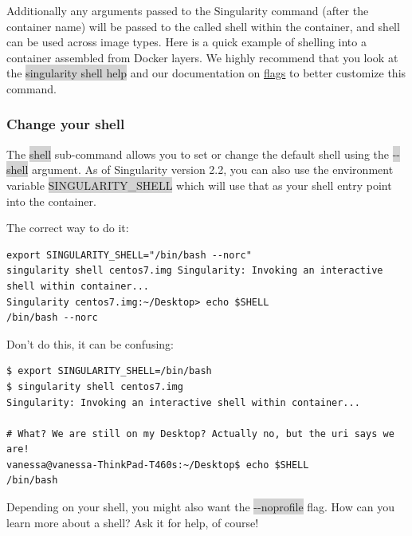 \documentclass[a4paper]{article}
\newcounter{subsubsubsection}[subsubsection]
\begin{document}
Additionally any arguments passed to the Singularity command (after the container name) will be passed to the called shell within the container, and shell can be used across image types. Here is a quick example of shelling into a container assembled from Docker layers. We highly recommend that you look at the \colorbox{lightgray}{singularity shell help} and our documentation on \href{http://singularity.lbl.gov/action-flags}{flags} to better customize this command.

	\subsubsection{Change your shell}
	
	The \colorbox{lightgray}{shell} sub-command allows you to set or change the default shell using the \colorbox{lightgray}{-{}-shell} argument. As of Singularity version 2.2, you can also use the environment variable \colorbox{lightgray}{SINGULARITY\_SHELL} which will use that as your shell entry point into the container.



The correct way to do it:\\[0.1in]
		
\begin{lstlisting}[frame=single]
export SINGULARITY_SHELL="/bin/bash --norc"
singularity shell centos7.img Singularity: Invoking an interactive shell within container...
Singularity centos7.img:~/Desktop> echo $SHELL
/bin/bash --norc
\end{lstlisting}


Don’t do this, it can be confusing:

\begin{lstlisting}[frame=single]
$ export SINGULARITY_SHELL=/bin/bash
$ singularity shell centos7.img 
Singularity: Invoking an interactive shell within container...

# What? We are still on my Desktop? Actually no, but the uri says we are!
vanessa@vanessa-ThinkPad-T460s:~/Desktop$ echo $SHELL
/bin/bash
\end{lstlisting}

Depending on your shell, you might also want the  \colorbox{lightgray}{-{}-noprofile} flag. How can you learn more about a shell? Ask it for help, of course!
\end{document}
